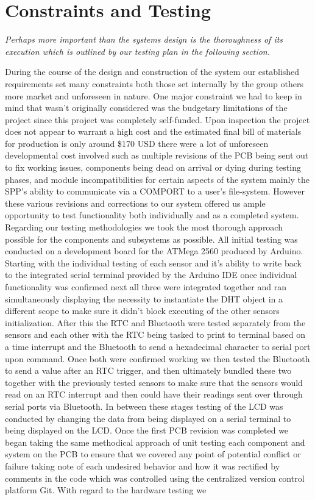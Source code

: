 \documentclass[comsoc, 12pt]{IEEEtran}
\begin{document}
\section{Constraints and Testing}
\begin{center}
    \textit{Perhaps more important than the systems design is the thoroughness of its execution which is outlined by our testing plan in the following section.}
\end{center}
\par During the course of the design and construction of the system our established requirements set many constraints both those set internally by the group others more market and unforeseen in nature. One major constraint we had to keep in mind that wasn't originally considered was the budgetary limitations of the project since this project was completely self-funded. Upon inspection the project does not appear to warrant a high cost and the estimated final bill of materials for production is only around \$170 USD there were a lot of unforeseen developmental cost involved such as multiple revisions of the PCB being sent out to fix working issues, components being dead on arrival or dying during testing phases, and module incompatibilities for certain aspects of the system mainly the SPP's ability to communicate via a COMPORT to a user's file-system. However these various revisions and corrections to our system offered us ample opportunity to test functionality both individually and as a completed system. Regarding our testing methodologies we took the most thorough approach possible for the components and subsystems as possible. All initial testing was conducted on a development board for the ATMega 2560 produced by Arduino. Starting with the individual testing of each sensor and it's ability to write back to the integrated serial terminal provided by the Arduino IDE once individual functionality was confirmed next all three were integrated together and ran simultaneously displaying the necessity to instantiate the DHT object in a different scope to make sure it didn't block executing of the other sensors initialization. After this the RTC and Bluetooth were tested separately from the sensors and each other with the RTC being tasked to print to terminal based on a time interrupt and the Bluetooth to send a hexadecimal character to serial port upon command. Once both were confirmed working we then tested the Bluetooth to send a value after an RTC trigger, and then ultimately bundled these two together with the previously tested sensors to make sure that the sensors would read on an RTC interrupt and then could have their readings sent over through serial ports via Bluetooth. In between these stages testing of the LCD was conducted by changing the data from being displayed on a serial terminal to being displayed on the LCD. Once the first PCB revision was completed we began taking the same methodical approach of unit testing each component and system on the PCB to ensure that we covered any point of potential conflict or failure taking note of each undesired behavior and how it was rectified by comments in the code which was controlled using the centralized version control platform Git. With regard to the hardware testing we 
\end{document}
